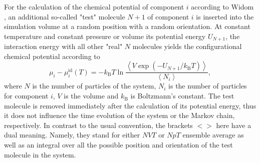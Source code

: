 For the calculation of the chemical potential of component $i$ according to Widom \cite{widom}, an additional so-called "test" molecule $N+1$ of component $i$ is inserted into the simulation volume at a random position with a random orientation. At constant temperature and constant pressure or volume its potential energy $U_{N+1}$, the interaction energy with all other "real" $N$ molecules yields the configurational chemical potential according to
\begin{equation}
\mu_{i}-\mu^{\text{id}}_{i}\left(T\right)=-k_{\text{B}}T \ln \frac{\left\langle V \exp \left(-U_{N+1}/k_{\text{B}}T\right)\right\rangle}{\left\langle N_{i}\right\rangle},
\label{eq:TestMoleculeInsertion}
\end{equation}
where $N$ is the number of particles of the system, $N_i$ is the number of particles for component $i$, $V$ is the volume and $k_\text{B}$ is Boltzmann's constant. The test molecule is removed immediately after the calculation of its potential energy, thus it does not influence the time evolution of the system or the Markov chain, respectively. In contrast to the usual convention, the brackets $<>$ here have a dual meaning. Namely, they stand for either $NVT$ or $NpT$ ensemble average as well as an integral over all the possible position and orientation of the test molecule in the system.

